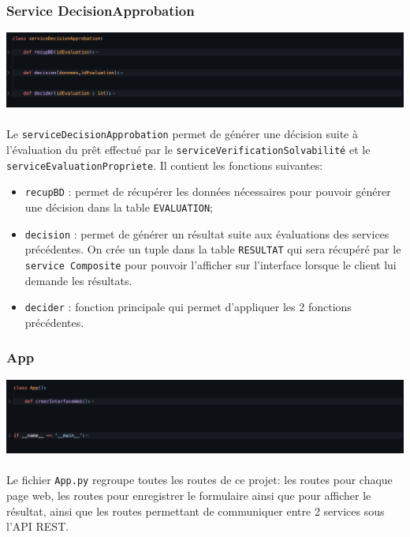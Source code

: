 \documentclass{article}
\begin{document}
        \subsubsection{Service DecisionApprobation}
            \includegraphics[width=\textwidth]{Images/11.2/decision.png} \\ \\ 
            Le \texttt{serviceDecisionApprobation} permet de générer une décision suite à l'évaluation du prêt effectué par le \texttt{serviceVerificationSolvabilité} et le \texttt{serviceEvaluationPropriete}. Il contient les fonctions suivantes:
            \begin{itemize}
            \item \texttt{recupBD} : permet de récupérer les données nécessaires pour pouvoir générer une décision dans la table \texttt{EVALUATION};
            \item \texttt{decision} : permet de générer un résultat suite aux évaluations des services précédentes. On crée un tuple dans la table \texttt{RESULTAT} qui sera récupéré par le \texttt{service Composite} pour pouvoir l'afficher sur l'interface lorsque le client lui demande les résultats.
            \item \texttt{decider} : fonction principale qui permet d'appliquer les 2 fonctions précédentes.
            \end{itemize}
        
        \subsubsection{App}
            \includegraphics[width=\textwidth]{Images/11.2/app.png} \\ \\ 
            Le fichier \texttt{App.py} regroupe toutes les routes de ce projet: les routes pour chaque page web, les routes pour enregistrer le formulaire ainsi que pour afficher le résultat, ainsi que les routes permettant de communiquer entre 2 services sous l'API REST. 
\end{document}
